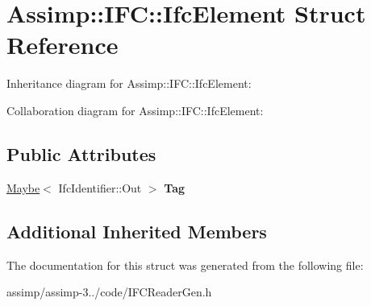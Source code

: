 \hypertarget{struct_assimp_1_1_i_f_c_1_1_ifc_element}{\section{Assimp\+:\+:I\+F\+C\+:\+:Ifc\+Element Struct Reference}
\label{struct_assimp_1_1_i_f_c_1_1_ifc_element}
}


Inheritance diagram for Assimp\+:\+:I\+F\+C\+:\+:Ifc\+Element\+:


Collaboration diagram for Assimp\+:\+:I\+F\+C\+:\+:Ifc\+Element\+:
\subsection*{Public Attributes}
\begin{DoxyCompactItemize}
\item 
\hypertarget{struct_assimp_1_1_i_f_c_1_1_ifc_element_a561aecf99a16857f701b68b2eb03cffd}{\hyperlink{struct_assimp_1_1_s_t_e_p_1_1_maybe}{Maybe}$<$ Ifc\+Identifier\+::\+Out $>$ {\bfseries Tag}}\label{struct_assimp_1_1_i_f_c_1_1_ifc_element_a561aecf99a16857f701b68b2eb03cffd}

\end{DoxyCompactItemize}
\subsection*{Additional Inherited Members}


The documentation for this struct was generated from the following file\+:\begin{DoxyCompactItemize}
\item 
assimp/assimp-\/3../code/I\+F\+C\+Reader\+Gen.\+h\end{DoxyCompactItemize}
